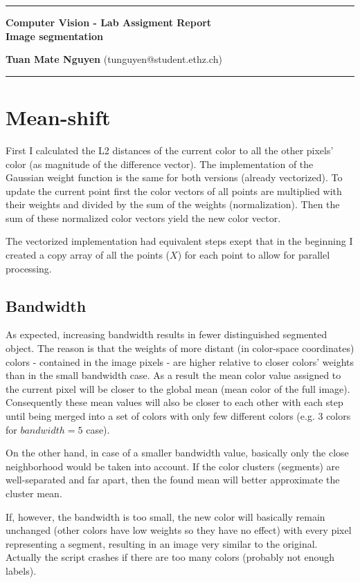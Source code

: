 \documentclass[10pt,a4paper,twoside]{article}
\begin{document}
\begin{center}
\hrule

\vspace{.2cm}
{\bf {\Large Computer Vision - Lab Assigment Report} \\ {\Large Image segmentation}}
\vspace{.1cm}
\end{center}
{\bf Tuan Mate Nguyen}  (tunguyen@student.ethz.ch)
\hrule
\section*{Mean-shift}
First I calculated the L2 distances of the current color to all the other
pixels' color (as magnitude of the difference vector).
The implementation of the Gaussian weight function is the same for both versions
(already vectorized).
To update the current point first the color vectors of all points are multiplied
with their weights and divided by the sum of the weights (normalization). Then the
sum of these normalized color vectors yield the new color vector.

The vectorized implementation had equivalent steps exept that in the beginning I
created a copy array of all the points ($X$) for each point to allow for parallel
processing. 

\subsection*{Bandwidth}
As expected, increasing bandwidth results in fewer distinguished segmented
object. The reason is that the weights of more distant (in color-space
coordinates) colors - contained in the
image pixels -  are higher relative to closer colors' weights than in the small bandwidth case.
 As a result the mean color value assigned
to the current pixel will be closer to the global mean (mean color of the full image).
Consequently these mean values will also be closer to each other with each step until
being merged into a set of colors with only few different colors (e.g. 3 colors for $bandwidth=5$ case).

On the other hand, in case of a smaller bandwidth value, basically only the
close neighborhood would be taken into account. If the color clusters (segments) are
well-separated and far apart, then the found mean will better approximate the cluster
mean.

If, however, the bandwidth is too small, the new color will basically remain
unchanged (other colors have low weights so they have no effect) with every pixel representing a segment, resulting in an image
very similar to the original. Actually the script crashes if there are too many
colors (probably not enough labels).
\end{document}
